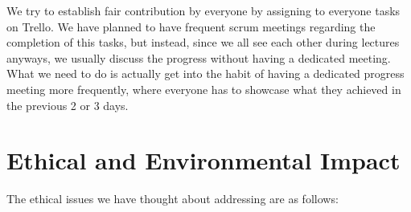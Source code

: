 \documentclass[a4paper,12pt]{article}
\begin{document}
	We try to establish fair contribution by everyone by assigning to everyone tasks on Trello. We have planned to have frequent scrum meetings regarding the completion of this tasks, but instead, since we all see each other during lectures anyways, we usually discuss the progress without having a dedicated meeting. What we need to do is actually get into the habit of having a dedicated progress meeting more frequently, where everyone has to showcase what they achieved in the previous 2 or 3 days.
	
	\section{Ethical and Environmental Impact}	
	
	The ethical issues we have thought about addressing are as follows:
	
\end{document}
